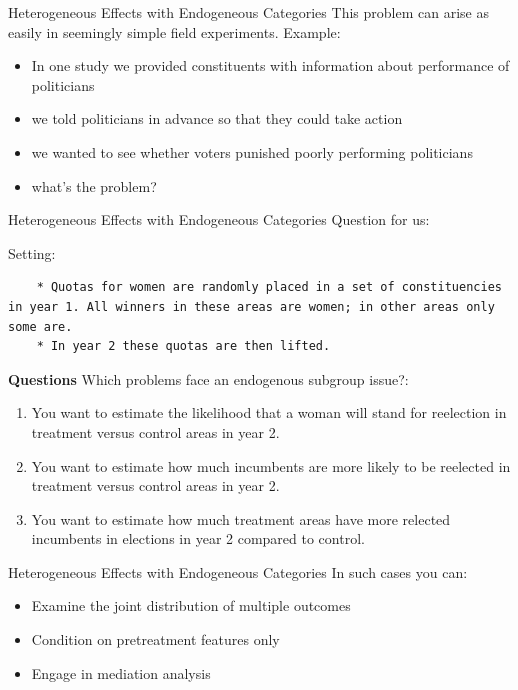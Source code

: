 \documentclass[
  11pt,
  ignorenonframetext,
]{beamer}
\providecommand{\tightlist}{%
  \setlength{\itemsep}{0pt}\setlength{\parskip}{0pt}}\usepackage{longtable,booktabs,array}
\begin{document}
\begin{frame}{Heterogeneous Effects with Endogeneous Categories}
\protect\hypertarget{heterogeneous-effects-with-endogeneous-categories-4}{}
This problem can arise as easily in seemingly simple field experiments.
Example:

\begin{itemize}
\tightlist
\item
  In one study we provided constituents with information about
  performance of politicians
\item
  we told politicians in advance so that they could take action
\item
  we wanted to see whether voters punished poorly performing politicians
\item
  what's the problem?
\end{itemize}
\end{frame}

\begin{frame}[fragile]{Heterogeneous Effects with Endogeneous
Categories}
\protect\hypertarget{heterogeneous-effects-with-endogeneous-categories-5}{}
Question for us:

Setting:

\begin{verbatim}
    * Quotas for women are randomly placed in a set of constituencies in year 1. All winners in these areas are women; in other areas only some are. 
    * In year 2 these quotas are then lifted. 
\end{verbatim}

\textbf{Questions} Which problems face an endogenous subgroup issue?:

\begin{enumerate}
\tightlist
\item
  You want to estimate the likelihood that a woman will stand for
  reelection in treatment versus control areas in year 2.
\item
  You want to estimate how much incumbents are more likely to be
  reelected in treatment versus control areas in year 2.
\item
  You want to estimate how much treatment areas have more relected
  incumbents in elections in year 2 compared to control.
\end{enumerate}
\end{frame}

\begin{frame}{Heterogeneous Effects with Endogeneous Categories}
\protect\hypertarget{heterogeneous-effects-with-endogeneous-categories-6}{}
In such cases you can:

\begin{itemize}
\tightlist
\item
  Examine the joint distribution of multiple outcomes
\item
  Condition on pretreatment features only
\item
  Engage in mediation analysis
\end{itemize}
\end{frame}
\end{document}

